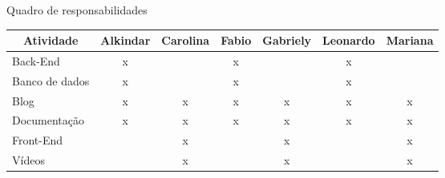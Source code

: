 \begin{center}
  \begin{quadro}[H]
	\caption{Quadro de responsabilidades}\label{tab:tab_resp}
    \begin{tabular}{|l|c|c|c|c|c|c|}
      \hline
      \multicolumn{1}{|c|}{\textbf{Atividade}} & \textbf{Alkindar}     & \textbf{Carolina}     & \textbf{Fabio}        & \textbf{Gabriely}     & \textbf{Leonardo}     & \textbf{Mariana}      \\ \hline
      Back-End                                 & x                     & \multicolumn{1}{l|}{} & x                     & \multicolumn{1}{l|}{} & x                     & \multicolumn{1}{l|}{} \\ \hline
      Banco de dados                           & x                     & \multicolumn{1}{l|}{} & x                     & \multicolumn{1}{l|}{} & x                     & \multicolumn{1}{l|}{} \\ \hline
      Blog                                     & x                     & x                     & x                     & x                     & x                     & x                     \\ \hline
      Documentação                             & x                     & x                     & x                     & x                     & x                     & x                     \\ \hline
      Front-End                                & \multicolumn{1}{l|}{} & x                     & \multicolumn{1}{l|}{} & x                     & \multicolumn{1}{l|}{} & x                     \\ \hline
      Vídeos                                   & \multicolumn{1}{l|}{} & x                     & \multicolumn{1}{l|}{} & x                     & \multicolumn{1}{l|}{} & x                     \\ \hline
    \end{tabular}
  \end{quadro}
\end{center}

